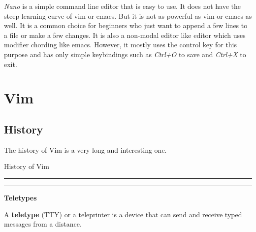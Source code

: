 \textit{Nano} is a simple command line editor that is easy to use.
It does not have the steep learning curve of vim or emacs.
But it is not as powerful as vim or emacs as well.
It is a common choice for beginners who just want to append a few lines to a file or make a few changes.
It is also a non-modal editor like editor which uses modifier chording like emacs.
However, it mostly uses the control key for this purpose and has only simple
keybindings such as \textit{Ctrl+O} to save and \textit{Ctrl+X} to exit.

\section{Vim}

\subsection{History}

The history of Vim is a very long and interesting one.

\begin{table}[h!]
\caption{History of Vim}
\centering
\begin{minipage}[t]{.7\linewidth}
\color{gray}
\rule{\linewidth}{1pt}
\bigskip
\rule{\linewidth}{1pt}
\end{minipage}
\end{table}

\textbf{Teletypes}

\begin{definition}
A \textbf{teletype} (TTY) or a teleprinter is a device that can send and receive typed messages from a distance.
\end{definition}

